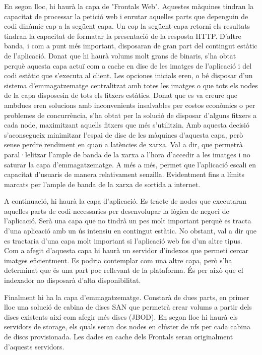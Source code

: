 En segon lloc, hi haurà la capa de "Frontals Web". Aquestes màquines tindran la capacitat de processar la petició web i enrutar aquelles parts que depenguin de codi dinàmic cap a la següent capa. Un cop la següent capa retorni els resultats tindran la capacitat de formatar la presentació de la resposta HTTP. D'altre banda, i com a punt més important, disposaran de gran part del contingut estàtic de l'aplicació. Donat que hi haurà volums molt grans de binaris, s'ha obtat perquè aquesta capa actuï com a cache en disc de les imatges de l'aplicació i del codi estàtic que s'executa al client. Les opciones inicials eren, o bé disposar d'un sistema d'emmagatzematge centralitzat amb totes les imatges o que tots els nodes de la capa disposesin de tots els fitxers estàtics. Donat que es va creure que ambdues eren solucions amb inconvenients insalvables per costos econòmics o per problemes de concurrència, s'ha obtat per la solució de disposar d'alguns fitxers a cada node, maximitzant aquells fitxers que més s'utilitzin.
Amb aquesta decisió s'aconsegueix minimitzar l'espai de disc de les màquines d'aquesta capa, però sense perdre rendiment en quan a latències de xarxa. Val a dir, que permetrà paral·lelitzar l'ample de banda de la xarxa a l'hora d'accedir a les imatges i no saturar la capa d'emmagatzematge. A més a més, permet que l'aplicació escali en capacitat d'usuaris de manera relativament senzilla. Evidentment fins a límits marcats per l'ample de banda de la xarxa de sortida a internet.   

A continuació, hi haurà la capa d'aplicació. Es tracte de nodes que executaran aquelles parts de codi necessaries per desenvolupar la lògica de negoci de l'aplicació. Serà una capa que no tindrà un pes molt important perquè es tracta d'una aplicació amb un ús intensiu en contingut estàtic. No obstant, val a dir que es tractaria d'una capa molt important si l'aplicació web fos d'un altre tipus.
Com a afegit d'aquesta capa hi haurà un servidor d'índexos que permeti cercar imatges eficientment. Es podria contemplar com una altre capa, però s'ha determinat que és una part poc rellevant de la plataforma. És per això que el indexador no disposarà d'alta disponibilitat.

Finalment hi ha la capa d'emmagatzematge. Constarà de dues parts, en primer lloc una solució de cabina de discs SAN que permetrà crear volums a partir dels discs existents així com afegir més discs (JBOD). En segon lloc hi haurà els servidors de storage, els quals seran dos nodes en clúster de nfs per cada cabina de discs provisionada. Les dades en cache dels Frontals seran originalment d'aquests servidors.
